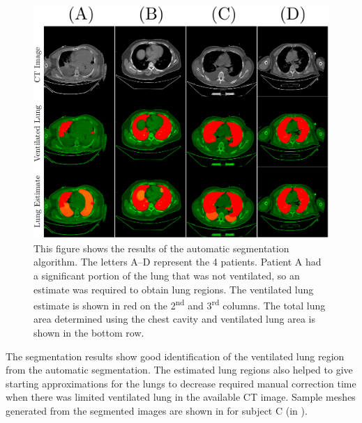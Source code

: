 \begin{figure}[H]
	\centering
	\includegraphics[width=\textwidth]{chapter5-CT_to_mesh/imgs/lung_segmentation_results.pdf}
	\caption[Lung segmentation results]{\label{fig:lung-seg-results}%
	This figure shows the results of the automatic segmentation algorithm. The letters A--D 
	represent the 4 patients. Patient A had a significant portion of the lung that was not
	ventilated, so an estimate was required to obtain lung regions. The ventilated lung estimate
	is shown in red on the 2\textsuperscript{nd} and 3\textsuperscript{rd} columns.
	The total lung area determined using the chest cavity and ventilated lung area is shown in the
	bottom row.}
\end{figure}

The segmentation results show good identification of the
ventilated lung region from the automatic segmentation. The estimated lung regions also helped to 
give starting approximations for the lungs to decrease required manual 
correction time when there was limited ventilated lung in the available CT image.
Sample meshes generated from the segmented images are shown in  
for subject C (in ).

